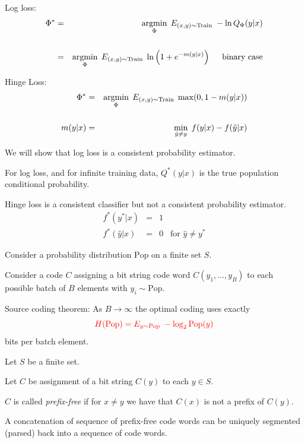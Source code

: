 {
Log loss:
\begin{eqnarray*}
  \Phi^* & = & \operatorname*{argmin}_\Phi\;E_{(x,y) \sim \mathrm{Train}}\;- \ln Q_\Phi(y|x) \\
  \\
  & = & \operatorname*{argmin}_\Phi\;E_{(x,y) \sim \mathrm{Train}}\;\ln \left(1 + e^{-m(y|x)}\right)\;\;\;\;\;\mbox{binary case}
\end{eqnarray*}

\vfill
Hinge Loss:
\begin{eqnarray*}
  \Phi^* & = & \operatorname*{argmin}_\Phi\;E_{(x,y) \sim \mathrm{Train}}\;\max(0,1-m(y|x)) \\
  \\
  m(y|x) & = & \min_{\hat{y} \not = y} \;f(y|x) - f(\hat{y}|x)
\end{eqnarray*}


We will show that log loss is a consistent probability estimator.

\vfill
For log loss, and for infinite training data, $Q^*(y|x)$ is the true population conditional probability.

\vfill
Hinge loss is a consistent classifier but not a consistent probability estimator.
\begin{eqnarray*}
  f^*(y^*|x) & = & 1 \\
  f^*(\hat{y}|x) & = & 0 \;\;\;\mbox{for $\hat{y} \not = y^*$}
\end{eqnarray*}



Consider a probability distribution $\mathrm{Pop}$ on a finite set $S$.

\vfill
Consider a code $C$ assigning a bit string code word $C(y_1,\ldots,y_B)$ to each possible batch of $B$ elements with $y_i \sim \mathrm{Pop}$.

\vfill
Source coding theorem: As $B \rightarrow \infty$ the optimal coding uses exactly
$${\color{red} H(\mathrm{Pop}) = E_{y\sim \mathrm{Pop}}\; - \log_2 \mathrm{Pop}(y)}$$
bits per batch element.


Let $S$ be a finite set.

\vfill
Let $C$ be assignment of a bit string $C(y)$ to each $y \in S$.

\vfill
$C$ is called {\em prefix-free} if for $x \not = y$ we have that $C(x)$ is not a prefix of $C(y)$.

\vfill
A concatenation of sequence of prefix-free code words can be uniquely segmented (parsed) back into a sequence of code words.

}

